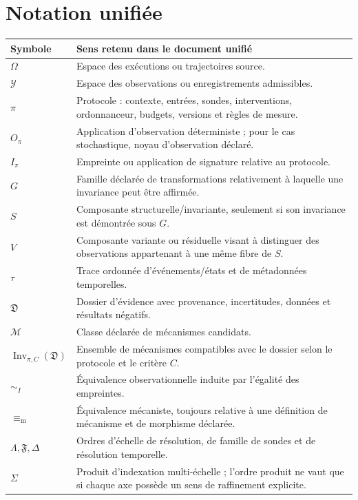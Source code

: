 \documentclass[11pt,oneside]{book}
\theoremstyle{definition}
\theoremstyle{remark}
\newcommand{\Ycal}{\mathcal Y}
\newcommand{\Mcal}{\mathcal M}
\newcommand{\1}{\mathbf 1}
\newcommand{\Inv}{\operatorname{Inv}}
\newcommand{\MechEq}{\equiv_{\mathrm m}}
\begin{document}
\chapter{Notation unifiée}
\begin{longtable}{>{\raggedright\arraybackslash}p{} >{\raggedright\arraybackslash}p{}}
\toprule
Symbole & Sens retenu dans le document unifié \\
\midrule\endhead
$\Omega$ & Espace des exécutions ou trajectoires source. \\
$\Ycal$ & Espace des observations ou enregistrements admissibles. \\
$\pi$ & Protocole : contexte, entrées, sondes, interventions, ordonnanceur, budgets, versions et règles de mesure. \\
$O_\pi$ & Application d'observation déterministe ; pour le cas stochastique, noyau d'observation déclaré. \\
$I_\pi$ & Empreinte ou application de signature relative au protocole. \\
$G$ & Famille déclarée de transformations relativement à laquelle une invariance peut être affirmée. \\
$S$ & Composante structurelle/invariante, seulement si son invariance est démontrée sous $G$. \\
$V$ & Composante variante ou résiduelle visant à distinguer des observations appartenant à une même fibre de $S$. \\
$\tau$ & Trace ordonnée d'événements/états et de métadonnées temporelles. \\
$\mathfrak D$ & Dossier d'évidence avec provenance, incertitudes, données et résultats négatifs. \\
$\Mcal$ & Classe déclarée de mécanismes candidats. \\
$\Inv_{\pi,C}(\mathfrak D)$ & Ensemble de mécanismes compatibles avec le dossier selon le protocole et le critère $C$. \\
$\sim_I$ & Équivalence observationnelle induite par l'égalité des empreintes. \\
$\MechEq$ & Équivalence mécaniste, toujours relative à une définition de mécanisme et de morphisme déclarée. \\
$\Lambda,\mathfrak F,\Delta$ & Ordres d'échelle de résolution, de famille de sondes et de résolution temporelle. \\
$\Sigma$ & Produit d'indexation multi-échelle ; l'ordre produit ne vaut que si chaque axe possède un sens de raffinement explicite. \\
\bottomrule
\end{longtable}
\end{document}

